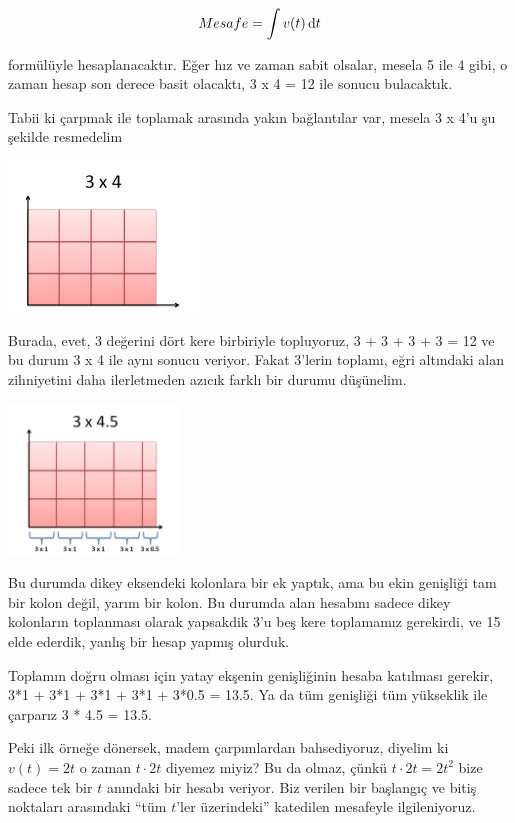 \documentclass[12pt,fleqn]{article}\usepackage{../../common}
\begin{document}
$$ Mesafe = \int v(t) \,\mathrm{d} t $$

formülüyle hesaplanacaktır. Eğer hız ve zaman sabit olsalar, mesela 5 ile 4
gibi, o zaman hesap son derece basit olacaktı, 3 x 4 = 12 ile sonucu
bulacaktık. 

Tabii ki çarpmak ile toplamak arasında yakın bağlantılar var, mesela 3 x
4'u şu şekilde resmedelim

\includegraphics[height=4cm]{ode_mattuck_94_int_04.png}

Burada, evet, 3 değerini dört kere birbiriyle topluyoruz, 3 + 3 + 3 + 3 =
12 ve bu durum 3 x 4 ile aynı sonucu veriyor. Fakat 3'lerin toplamı, eğri
altındaki alan zihniyetini daha ilerletmeden azıcık farklı bir durumu
düşünelim. 

\includegraphics[height=4cm]{ode_mattuck_94_int_09.png}

Bu durumda dikey eksendeki kolonlara bir ek yaptık, ama bu ekin genişliği
tam bir kolon değil, yarım bir kolon. Bu durumda alan hesabını sadece dikey
kolonların toplanması olarak yapsakdik 3'u beş kere toplamamız gerekirdi,
ve 15 elde ederdik, yanlış bir hesap yapmış olurduk.

Toplamın doğru olması için yatay ekşenin genişliğinin hesaba katılması
gerekir, 3*1 + 3*1 + 3*1 + 3*1 + 3*0.5 = 13.5. Ya da tüm genişliği tüm
yükseklik ile çarparız 3 * 4.5 = 13.5. 

Peki ilk örneğe dönersek, madem çarpımlardan bahsediyoruz, diyelim ki
$v(t) = 2t$ o zaman $t \cdot 2t$ diyemez miyiz? Bu da olmaz, çünkü $t\cdot 2t = 2t^2$ 
bize sadece tek bir $t$ anındaki bir hesabı veriyor. Biz verilen bir 
başlangıç ve bitiş noktaları arasındaki ``tüm $t$'ler üzerindeki'' 
katedilen mesafeyle ilgileniyoruz.  
\end{document}
